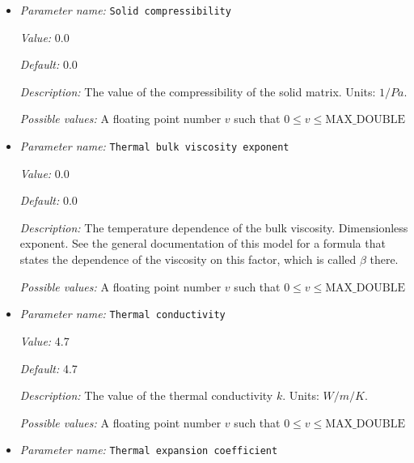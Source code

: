 \begin{itemize}
{\it Possible values:} A floating point number $v$ such that $0 \leq v \leq \text{MAX\_DOUBLE}$
\item {\it Parameter name:} {\tt Solid compressibility}
\label{parameters:Material model/Melt simple/Solid compressibility}
\label{parameters:Material_20model/Melt_20simple/Solid_20compressibility}


{\it Value:} 0.0


{\it Default:} 0.0


{\it Description:} The value of the compressibility of the solid matrix. Units: $1/Pa$.


{\it Possible values:} A floating point number $v$ such that $0 \leq v \leq \text{MAX\_DOUBLE}$
\item {\it Parameter name:} {\tt Thermal bulk viscosity exponent}
\label{parameters:Material model/Melt simple/Thermal bulk viscosity exponent}
\label{parameters:Material_20model/Melt_20simple/Thermal_20bulk_20viscosity_20exponent}


{\it Value:} 0.0


{\it Default:} 0.0


{\it Description:} The temperature dependence of the bulk viscosity. Dimensionless exponent. See the general documentation of this model for a formula that states the dependence of the viscosity on this factor, which is called $\beta$ there.


{\it Possible values:} A floating point number $v$ such that $0 \leq v \leq \text{MAX\_DOUBLE}$
\item {\it Parameter name:} {\tt Thermal conductivity}
\label{parameters:Material model/Melt simple/Thermal conductivity}
\label{parameters:Material_20model/Melt_20simple/Thermal_20conductivity}


{\it Value:} 4.7


{\it Default:} 4.7


{\it Description:} The value of the thermal conductivity $k$. Units: $W/m/K$.


{\it Possible values:} A floating point number $v$ such that $0 \leq v \leq \text{MAX\_DOUBLE}$
\item {\it Parameter name:} {\tt Thermal expansion coefficient}
\label{parameters:Material model/Melt simple/Thermal expansion coefficient}
\label{parameters:Material_20model/Melt_20simple/Thermal_20expansion_20coefficient}



\end{itemize}
